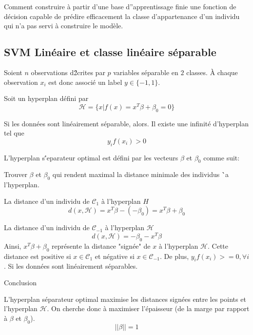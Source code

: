 \documentclass{article}
\begin{document}
Comment construire \`a partir d'une base d''apprentissage finie une fonction de d\'ecision capable de pr\'edire efficacement la classe d'appartenance d'un individu qui n'a pas servi \`a construire le mod\`ele.

\subsection{SVM Lin\'eaire et classe lin\'eaire s\'eparable}

Soient $n$ observations d\'2crites par $p$ variables s\'eparable en $2$ classes.
\`A chaque observation $x_i$ est donc associ\'e un label $y\in\{-1,1\}$.

Soit un hyperplan d\'efini par
\begin{equation}
\mathcal{H}=\{x|f(x)=x^T\beta+\beta_0=0\}
\end{equation}

Si les donn\'ees sont lin\'eairement s\'eparable, alors. Il existe une infinit\'e d'hyperplan tel que 
\begin{equation}
y_if(x_i)>0
\end{equation}

L'hyperplan  s\''eparateur optimal  est d\'efini par les vecteurs $\beta$ et $\beta_0$ comme suit:

Trouver $\beta$ et $\beta_0$ qui rendent maximal la distance minimale des individus \``a l'hyperplan.

La distance d'un individu de $\mathcal{C}_1$ \`a l'hyperplan $H$
\begin{equation}
d(x,\mathcal{H})=x^T\beta-(-\beta_0)=x^T\beta+\beta_0
\end{equation}

La distance d'un individu de $\mathcal{C}_{-1}$  \`a l'hyperplan $\mathcal{H}$
\begin{equation}
d(x,\mathcal{H})=-\beta_0-x^T\beta
\end{equation}
Ainsi, $x^T\beta+\beta_0$ repr\'esente  la distance "sign\'ee" de $x$ \`a l'hyperplan $\mathcal{H}$. Cette distance est positive si $x\in\mathcal{C}_1$ et n\'egative si  $x\in\mathcal{C}_{-1}$. De plus, $y_if(x_i)>=0,\forall i$. Si les donn\'ees sont lin\'eairement s\'eparables.

Conclusion

L'hyperplan s\'eparateur  optimal maximise les distances sign\'ees entre les points et l'hyperplan $\mathcal{H}$.
On cherche donc \`a maximiser l'\'epaisseur (de la marge par rapport \`a $\beta$ et $\beta_0$).
\begin{equation}
||\beta||=1
\end{equation}
\end{document}
